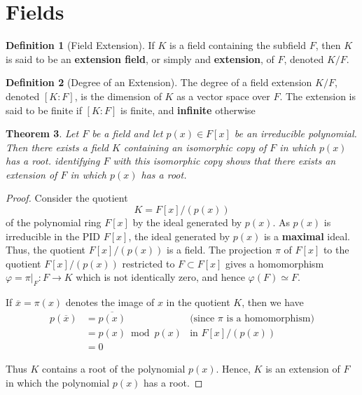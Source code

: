 \documentclass[10pt, oneside, reqno]{amsart}
\theoremstyle{plain}%
\newtheorem{thm}{Theorem}[section]
\theoremstyle{definition}
\newtheorem{defn}[thm]{Definition}
\theoremstyle{remark}
\newcommand{\xdeg}[2]{[#1 : #2]}
\begin{document}


\section{Fields} %

\label{sec:fields}

\begin{defn}[Field Extension]
	If $K$ is a field containing the subfield $F$, then $K$ is said to be an \textbf{extension field}, or simply and \textbf{extension}, of $F$, denoted $K/F$.  
\end{defn}

\begin{defn}[Degree of an Extension]
	The degree of a field extension $K/F$, denoted $\xdeg{K}{F}$, is the dimension of $K$ as a vector space over $F$.  The extension is said to be finite if $\xdeg{K}{F}$ is finite, and \textbf{infinite} otherwise
\end{defn}

\begin{thm}
	Let $F$ be a field and let $p(x) \in F[x]$ be an irreducible polynomial.  Then there exists a field $K$ containing an isomorphic copy of $F$ in which $p(x)$ has a root.  identifying $F$ with this isomorphic copy shows that there exists an extension of $F$ in which $p(x)$ has a root. 
\end{thm}
\begin{proof}
	 Consider the quotient  \[
		K = F[x]/(p(x))
	\] of the polynomial ring $F[x]$ by the ideal generated by $p(x)$.  As $p(x)$ is irreducible in the PID $F[x]$, the ideal generated by $p(x)$ is a \textbf{maximal} ideal.  Thus, the quotient $F[x]/(p(x))$ is a field.  The projection $\pi$ of $F[x]$ to the quotient $F[x]/(p(x))$ restricted to $F \subset F[x]$ gives a homomorphism $\varphi = \pi |_{F} : F \rightarrow K$ which is not identically zero, and hence $\varphi(F) \simeq F$.  
	
	If $\overline{x} = \pi(x)$ denotes the image of $x$ in the quotient $K$, then we have \begin{align*}
		p(\overline{x}) &= \overline{p(x)}  &\text{(since $\pi$ is a homomorphism)} \\
					&=  p(x) \bmod p(x)	 &\text{in $F[x]/(p(x))$} \\
					&= 0
	\end{align*}
	
	Thus $K$ contains a root of the polynomial $p(x)$.  Hence, $K$ is an extension of $F$ in which the polynomial $p(x)$ has a root. 
\end{proof}
\end{document}
